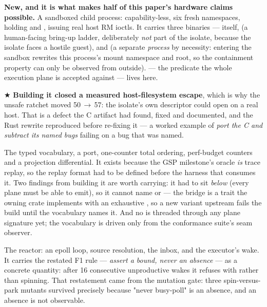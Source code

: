 \documentclass[10.5pt]{article}
\begin{document}
\textbf{New, and it is what makes half of this paper's hardware claims possible.} A sandboxed
child process: capability-less, six fresh namespaces, holding  and
, issuing real host RM ioctls. It carries three binaries —
 itself,  (a human-facing bring-up ladder,
deliberately \emph{not} part of the isolate, because the isolate faces a hostile guest), and
 (a separate \emph{process} by necessity: entering the sandbox
rewrites this process's mount namespace and root, so the containment property can only be
observed from outside).  — the predicate the whole execution plane is
accepted against — lives here.

★ \textbf{Building it closed a measured host-filesystem escape}, which is why the unsafe ratchet
moved 50\,$\to$\,57: the isolate's own  descriptor could open  on
a real host. That is a defect the C artifact had found, fixed and documented, and the Rust
rewrite reproduced before re-fixing it — a worked example of \emph{port the C and subtract its
named bugs} failing on a bug that was named.

The typed  vocabulary, a  port, one-counter total ordering,
perf-budget counters and a projection differential. It exists because the GSP milestone's oracle
\emph{is} trace replay, so the replay format had to be defined before the harness that consumes
it. Two findings from building it are worth carrying: it had to sit \emph{below}
 (every plane must be able to emit), so it cannot name  or
 — the bridge is a trait the owning crate implements with an exhaustive
, so a new variant upstream fails the build until the vocabulary names it. And no
 is threaded through any plane signature yet; the vocabulary is driven only
from the conformance suite's seam observer.

The reactor: an epoll loop, source resolution, the inbox, and the executor's wake. It carries
the restated F1 rule — \emph{assert a bound, never an absence} — as a concrete quantity: after
16 consecutive unproductive wakes it refuses with  rather
than spinning. That restatement came from the mutation gate: three spin-versus-park mutants
survived precisely because "never busy-poll" is an absence, and an absence is not observable.
\end{document}
